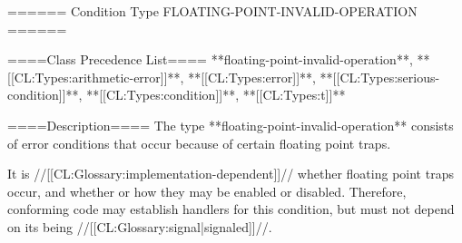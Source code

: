 ====== Condition Type FLOATING-POINT-INVALID-OPERATION ======

====Class Precedence List==== 
**floating-point-invalid-operation**, **[[CL:Types:arithmetic-error]]**, **[[CL:Types:error]]**, **[[CL:Types:serious-condition]]**, **[[CL:Types:condition]]**, **[[CL:Types:t]]**

====Description====
The type **floating-point-invalid-operation** consists of error conditions that occur because of certain floating point traps.

It is //[[CL:Glossary:implementation-dependent]]// whether floating point traps occur, and whether or how they may be enabled or disabled. Therefore, conforming code may establish handlers for this condition, but must not depend on its being //[[CL:Glossary:signal|signaled]]//.

